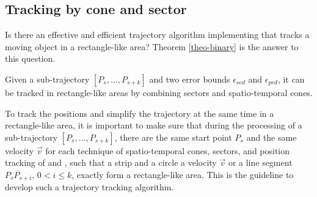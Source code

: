 \subsection{Tracking by cone and sector}

Is there an effective and efficient trajectory algorithm implementing \bed that tracks a moving object in a rectangle-like area? Theorem \ref{theo-binary} is the answer to this question.
\begin{theorem}
	\label{theo-binary}
	Given a sub-trajectory $[P_s,...,P_{s+k}]$ and two error bounds $\epsilon_{sed}$ and $\epsilon_{ped}$, it can be tracked in rectangle-like areas by combining sectors and spatio-temporal cones.
\end{theorem}

To track the positions and simplify the trajectory at the same time in a rectangle-like area, it is important to make sure that during the processing of a sub-trajectory $[P_s,...,P_{s+k}]$, there are the same start point $P_s$ and the same velocity $\vec{v}$ for each technique of spatio-temporal cones, sectors, and position tracking of \ped and \sed, such that a strip and a circle \wrt a velocity $\vec{v}$ or a line segment $\overline{P_sP_{s+i}}$, $0<i\le k$, exactly form a rectangle-like area. This is the guideline to develop such a trajectory tracking algorithm. 









